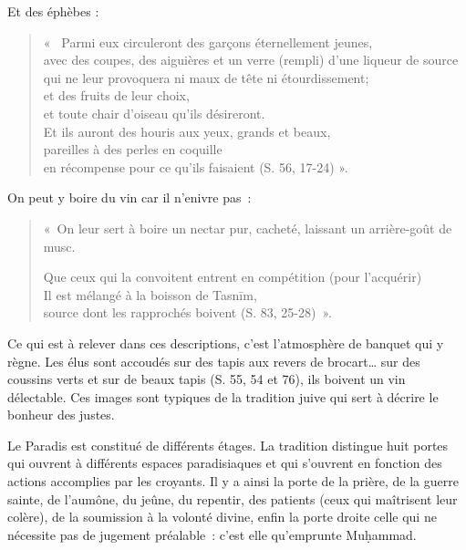 Et des éphèbes : 
\begin{quote}
    «~ Parmi eux circuleront des garçons éternellement
jeunes,\\
avec des coupes, des aiguières et un verre (rempli) d'une liqueur de
source\\
qui ne leur provoquera ni maux de tête ni étourdissement;\\
et des fruits de leur choix,\\
et toute chair d'oiseau qu'ils désireront.\\
Et ils auront des houris aux yeux, grands et beaux,\\
pareilles à des perles en coquille\\
en récompense pour ce qu'ils faisaient (S. 56, 17-24) ».
\end{quote}

On peut y boire du vin car il n'enivre pas~:
\begin{quote}
   «~On leur sert à boire un nectar pur, cacheté, laissant un arrière-goût
de musc.

Que ceux qui la convoitent entrent en compétition (pour l'acquérir)\\
Il est mélangé à la boisson de Tasnīm,\\
source dont les rapprochés boivent (S. 83, 25-28)~». 
\end{quote}


Ce qui est à relever dans ces descriptions, c'est l'atmosphère de
banquet qui y règne. Les élus sont accoudés sur des tapis aux revers de
brocart\ldots{} sur des coussins verts et sur de beaux tapis (S. 55, 54
et 76), ils boivent un vin délectable. Ces images sont typiques de la
tradition juive qui sert à décrire le bonheur des justes.


Le Paradis est constitué de différents étages. La tradition distingue
huit portes qui ouvrent à différents espaces paradisiaques et qui
s'ouvrent en fonction des actions accomplies par les croyants. Il y a
ainsi la porte de la prière, de la guerre sainte, de l'aumône, du jeûne,
du repentir, des patients (ceux qui maîtrisent leur colère), de la
soumission à la volonté divine, enfin la porte droite celle qui ne
nécessite pas de jugement préalable~: c'est elle qu'emprunte Muḥammad.

